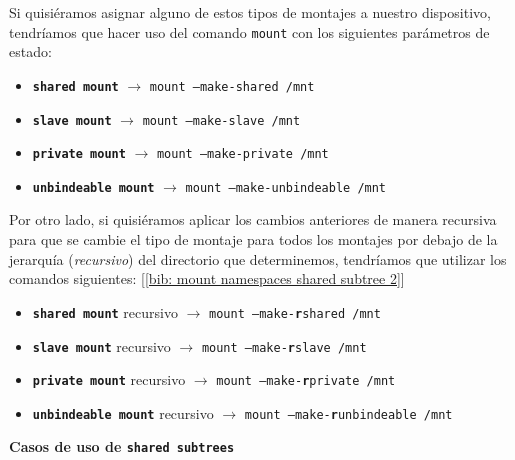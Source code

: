 \documentclass[12pt]{article}
\begin{document}
	\noindent Si quisiéramos asignar alguno de estos tipos de montajes a nuestro dispositivo, tendríamos que hacer uso del comando \texttt{mount} con los siguientes parámetros de estado:
	\begin{itemize}
		\item \textbf{\texttt{shared mount}} $\rightarrow$ \texttt{mount --make-shared /mnt}
		\item \textbf{\texttt{slave mount}} $\rightarrow$ \texttt{mount --make-slave /mnt}
		\item \textbf{\texttt{private mount}} $\rightarrow$ \texttt{mount --make-private /mnt}
		\item \textbf{\texttt{unbindeable mount}} $\rightarrow$ \texttt{mount --make-unbindeable /mnt}
	\end{itemize}

	\noindent Por otro lado, si quisiéramos aplicar los cambios anteriores de manera recursiva para que se cambie el tipo de montaje para todos los montajes por debajo de la jerarquía (\textit{recursivo}) del directorio que determinemos, tendríamos que utilizar los comandos siguientes: [\ref{bib: mount namespaces shared subtree 2}]
	\begin{itemize}
		\item \textbf{\texttt{shared mount}} recursivo $\rightarrow$ \texttt{mount --make-\textbf{r}shared /mnt}
		\item \textbf{\texttt{slave mount}} recursivo $\rightarrow$ \texttt{mount --make-\textbf{r}slave /mnt}
		\item \textbf{\texttt{private mount}} recursivo $\rightarrow$ \texttt{mount --make-\textbf{r}private /mnt}
		\item \textbf{\texttt{unbindeable mount}} recursivo $\rightarrow$ \texttt{mount --make-\textbf{r}unbindeable /mnt}
	\end{itemize}

	\pagebreak
	
	\noindent \textbf{\large Casos de uso de \texttt{shared subtrees}}
	
\end{document}
